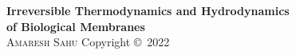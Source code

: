 


\vspace*{5.2cm}
\begin{center}
	\normalsize
	\textbf{Irreversible Thermodynamics and Hydrodynamics\\[3pt]of Biological Membranes}\\[22pt]
	\textsc{Amaresh Sahu}
	\vfill
	Copyright \copyright~2022\\[4pt]
\end{center}



